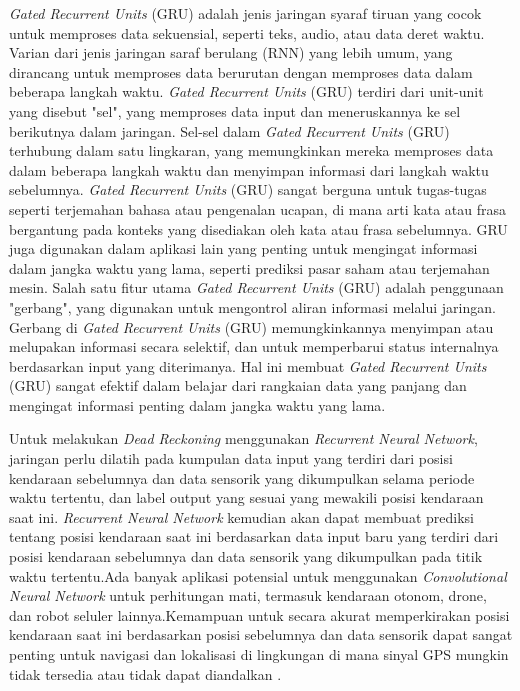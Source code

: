 \emph{Gated Recurrent Units} (GRU) adalah jenis jaringan syaraf tiruan yang cocok untuk memproses data sekuensial, seperti teks, audio, atau data deret waktu. Varian dari jenis jaringan saraf berulang (RNN) yang 
lebih umum, yang dirancang untuk memproses data berurutan dengan memproses data dalam beberapa langkah waktu. \emph{Gated Recurrent Units} (GRU) terdiri dari unit-unit yang disebut "sel", yang memproses data input 
dan meneruskannya ke sel berikutnya dalam jaringan. Sel-sel dalam \emph{Gated Recurrent Units} (GRU) terhubung dalam satu lingkaran, yang memungkinkan mereka memproses data dalam beberapa langkah waktu dan menyimpan 
informasi dari langkah waktu sebelumnya. \emph{Gated Recurrent Units} (GRU) sangat berguna untuk tugas-tugas seperti terjemahan bahasa atau pengenalan ucapan, di mana arti kata atau frasa bergantung pada konteks 
yang disediakan oleh kata atau frasa sebelumnya. GRU juga digunakan dalam aplikasi lain yang penting untuk mengingat informasi dalam jangka waktu yang lama, seperti prediksi pasar saham atau terjemahan mesin. Salah 
satu fitur utama \emph{Gated Recurrent Units} (GRU) adalah penggunaan "gerbang", yang digunakan untuk mengontrol aliran informasi melalui jaringan. Gerbang di \emph{Gated Recurrent Units} (GRU) memungkinkannya 
menyimpan atau melupakan informasi secara selektif, dan untuk memperbarui status internalnya berdasarkan input yang diterimanya. Hal ini membuat \emph{Gated Recurrent Units} (GRU) sangat efektif dalam belajar dari 
rangkaian data yang panjang dan mengingat informasi penting dalam jangka waktu yang lama. \parencite{Dey2017}

Untuk melakukan \emph{Dead Reckoning} menggunakan \emph{Recurrent Neural Network}, jaringan perlu dilatih pada kumpulan data input yang terdiri dari posisi kendaraan sebelumnya dan data sensorik yang dikumpulkan 
selama periode waktu tertentu, dan label output yang sesuai yang mewakili posisi kendaraan saat ini. \emph{Recurrent Neural Network}  kemudian akan dapat membuat prediksi tentang posisi kendaraan saat ini 
berdasarkan data input baru yang terdiri dari posisi kendaraan sebelumnya dan data sensorik yang dikumpulkan pada titik waktu tertentu.Ada banyak aplikasi potensial untuk menggunakan \emph{Convolutional Neural Network}  
untuk perhitungan mati, termasuk kendaraan otonom, drone, dan robot seluler lainnya.Kemampuan untuk secara akurat memperkirakan posisi kendaraan saat ini berdasarkan posisi sebelumnya dan data sensorik dapat sangat 
penting untuk navigasi dan lokalisasi di lingkungan di mana sinyal GPS mungkin tidak tersedia atau tidak dapat diandalkan \parencite{Albawi2017}. 


